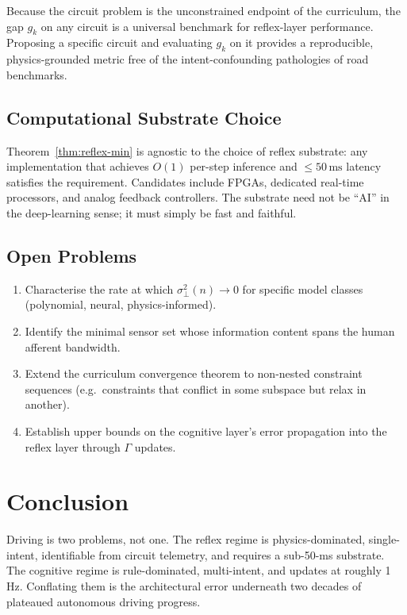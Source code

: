 \documentclass[11pt,twocolumn]{article}
\theoremstyle{definition}
\theoremstyle{remark}
\begin{document}
Because the circuit problem is the unconstrained endpoint of the curriculum, the gap $g_k$ on any circuit is a universal benchmark for reflex-layer performance. Proposing a specific circuit and evaluating $g_k$ on it provides a reproducible, physics-grounded metric free of the intent-confounding pathologies of road benchmarks.

\subsection{Computational Substrate Choice}

Theorem~\ref{thm:reflex-min} is agnostic to the choice of reflex substrate: any implementation that achieves $O(1)$ per-step inference and $\le 50\,\mathrm{ms}$ latency satisfies the requirement. Candidates include FPGAs, dedicated real-time processors, and analog feedback controllers. The substrate need not be ``AI'' in the deep-learning sense; it must simply be fast and faithful.

\subsection{Open Problems}

\begin{enumerate}[leftmargin=*,itemsep=2pt]
\item Characterise the rate at which $\sigma^2_{\perp}(n) \to 0$ for specific model classes (polynomial, neural, physics-informed).
\item Identify the minimal sensor set whose information content spans the human afferent bandwidth.
\item Extend the curriculum convergence theorem to non-nested constraint sequences (e.g.\ constraints that conflict in some subspace but relax in another).
\item Establish upper bounds on the cognitive layer's error propagation into the reflex layer through $\Gamma$ updates.
\end{enumerate}

\section{Conclusion}
\label{sec:conclusion}

Driving is two problems, not one. The reflex regime is physics-dominated, single-intent, identifiable from circuit telemetry, and requires a sub-50-ms substrate. The cognitive regime is rule-dominated, multi-intent, and updates at roughly 1\,Hz. Conflating them is the architectural error underneath two decades of plateaued autonomous driving progress.
\end{document}
